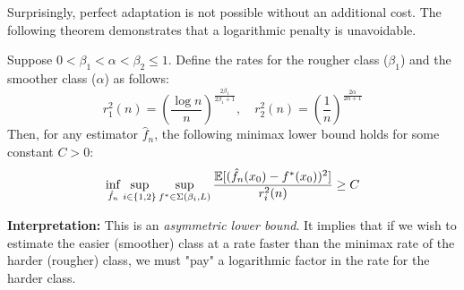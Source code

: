 Surprisingly, perfect adaptation is not possible without an additional cost. The following theorem demonstrates that a logarithmic penalty is unavoidable.

\noindent\begin{thm}
Suppose $0 < \beta_1 < \alpha < \beta_2 \leq 1$. Define the rates for the rougher class ($\beta_1$) and the smoother class ($\alpha$) as follows:
\[
r_1^2(n) = \left( \frac{\log n}{n} \right)^{\frac{2\beta_1}{2\beta_1+1}}, \quad r_2^2(n) = \left( \frac{1}{n} \right)^{\frac{2\alpha}{2\alpha+1}}
\]
Then, for any estimator $\hat{f}_n$, the following minimax lower bound holds for some constant $C > 0$:
\[
\inf_{\hat{f}_n} \sup_{i \in \{1, 2\}} \sup_{f^* \in \Sigma(\beta_i, L)} \frac{\mathbb{E}[(\hat{f}_n(x_0) - f^*(x_0))^2]}{r_i^2(n)} \geq C
\]
\end{thm}
\noindent \textbf{Interpretation:} This is an \textit{asymmetric lower bound}. It implies that if we wish to estimate the easier (smoother) class at a rate faster than the minimax rate of the harder (rougher) class, we must "pay" a logarithmic factor in the rate for the harder class.

